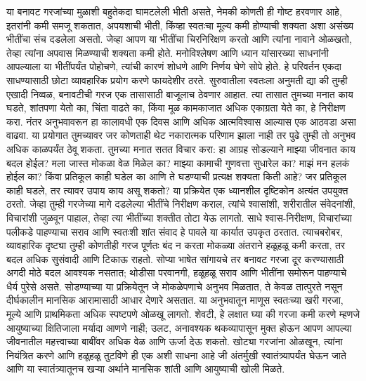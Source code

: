 या बनावट गरजांच्या मुळाशी बहुतेकदा घामटलेली भीती असते, नेमकी कोणती ही गोष्ट हरवणार आहे, इतरांनी कमी समजू शकतात, अपयशाची भीती, किंव्हा स्वतःचा मूल्य कमी होण्याची शक्यता अशा असंख्य भीतींचा संच दडलेला असतो. जेव्हा आपण या भीतींचा चिरनिरिक्षण करतो आणि त्यांना नावाने ओळखतो, तेव्हा त्यांना अपवास मिळण्याची शक्यता कमी होते. मनोविश्लेषण आणि ध्यान यांसारख्या साधनांनी आपल्याला या भीतींपर्यंत पोहोचणे, त्यांची कारणं शोधणे आणि निर्णय घेणे सोपे होते.
हे परिवर्तन एकदा साधण्यासाठी छोटा व्यावहारिक प्रयोग करणे फायदेशीर ठरते. सुरुवातीला स्वतःला अनुमती द्या की तुम्ही एखादी निव्वळ, बनावटीची गरज एक तासासाठी बाजूलाच ठेवणार आहात. त्या तासात तुमच्या मनात काय घडते, शांतपणा येतो का, चिंता वाढते का, किंवा मूळ कामकाजात अधिक एकाग्रता येते का, हे निरीक्षण करा. नंतर अनुभवावरून हा कालावधी एक दिवस आणि अधिक आत्मविश्वास आल्यास एक आठवडा असा वाढवा. या प्रयोगात तुमच्यावर जर कोणताही थेट नकारात्मक परिणाम झाला नाही तर पुढे तुम्ही तो अनुभव अधिक काळपर्यंत ठेवू शकता. तुमच्या मनात सतत विचार करा: हा आग्रह सोडल्याने माझ्या जीवनात काय बदल होईल? मला जास्त मोकळा वेळ मिळेल का? माझ्या कामाची गुणवत्ता सुधारेल का? माझं मन हलकं होईल का? किंवा प्रतिकूल काही घडेल का आणि ते घडण्याची प्रत्यक्ष शक्यता किती आहे? जर प्रतिकूल काही घडले, तर त्यावर उपाय काय असू शकतो?
या प्रक्रियेत एक ध्यानशील दृष्टिकोन अत्यंत उपयुक्त ठरतो. जेव्हा तुम्ही गरजेच्या मागे दडलेल्या भीतींचे निरीक्षण कराल, त्यांचे श्वासांशी, शरीरातील संवेदनांशी, विचारांशी जुळवून पाहाल, तेव्हा त्या भीतींच्या शक्तीत तोटा येऊ लागतो. साधे श्वास-निरीक्षण, विचारांच्या पलीकडे पाहण्याचा सराव आणि स्वतःशी शांत संवाद हे पावले या कार्यात उपकृत ठरतात. त्याचबरोबर, व्यावहारिक दृष्ट्या तुम्ही कोणतीही गरज पूर्णतः बंद न करता मोकळ्या अंतराने हळूहळू कमी करता, तर बदल अधिक सुसंवादी आणि टिकाऊ राहतो.
सोप्या भाषेत सांगायचे तर बनावट गरजा दूर करण्यासाठी अगदी मोठे बदल आवश्यक नसतात; थोडीसा परवानगी, हळूहळू सराव आणि भीतींना समोरून पाहण्याचे धैर्य पुरेसे असते. सोडण्याच्या या प्रक्रियेतून जे मोकळेपणाचे अनुभव मिळतात, ते केवळ तात्पुरते नसून दीर्घकालीन मानसिक आरामासाठी आधार देणारे असतात. या अनुभवातून माणूस स्वतःच्या खरी गरजा, मूल्ये आणि प्राथमिकता अधिक स्पष्टपणे ओळखू लागतो.
शेवटी, हे लक्षात घ्या की गरजा कमी करणे म्हणजे आयुष्याच्या क्षितिजाला मर्यादा आणणे नाही; उलट, अनावश्यक थकव्यापासून मुक्त होऊन आपण आपल्या जीवनातील महत्त्वाच्या बाबींवर अधिक वेळ आणि ऊर्जा देऊ शकतो. खोट्या गरजांना ओळखून, त्यांना नियंत्रित करणे आणि हळूहळू तुटविणे ही एक अशी साधना आहे जी अंतर्मुखी स्वातंत्र्यापर्यंत घेऊन जाते आणि या स्वातंत्र्यातूनच खऱ्या अर्थाने मानसिक शांती आणि आयुष्याची खोली मिळते.
 
